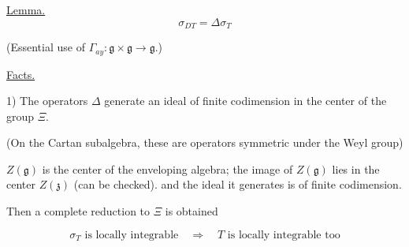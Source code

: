 \underline{Lemma.}
\begin{equation*}\sigma_{DT}=\Delta\sigma_T\end{equation*}



(Essential use of $\Gamma_{ay}:\mathfrak g\times\mathfrak g\longrightarrow\mathfrak g$.)



\underline{Facts.}



1) The operators $\Delta$ generate an ideal of finite codimension in the center of the group $\Xi$.



(On the Cartan subalgebra, these are operators symmetric under the Weyl group)








$Z (\mathfrak g)$ is the center of the enveloping algebra; the image of $Z (\mathfrak g)$ lies
in the center $Z (\mathfrak z)$ (can be checked). and the ideal it
generates is of finite codimension.








Then a complete reduction to $\Xi$ is obtained



\begin{equation*}
\sigma_T\text{ is locally integrable}\quad\Longrightarrow\quad T\text{ is locally integrable too}
\end{equation*}



